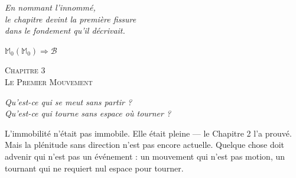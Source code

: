 \documentclass[10pt, openany, oneside]{book}
\renewcommand{\large}{\fontsize{11.5}{14}\selectfont}
\renewcommand{\huge}{\fontsize{17}{21}\selectfont}
\begin{document}
\vspace{0.5em}

\begin{center}
    \itshape
    En nommant l'innommé,\\
    le chapitre devint la première fissure\\
    dans le fondement qu'il décrivait.
\end{center}

\vspace{0.5em}

\begin{center}
    $\mathbb{M}_0(\mathbb{M}_0) \Rightarrow \mathcal{B}$
\end{center}

%
%
%
%

\newpage

\begin{center}
    {\huge\scshape Chapitre 3}\\[0.3em]
    {\large\scshape Le Premier Mouvement}
\end{center}

\vspace{1.5em}

\begin{center}
    \itshape
    Qu'est-ce qui se meut sans partir ?\\
    Qu'est-ce qui tourne sans espace où tourner ?
\end{center}

\vspace{2em}


\noindent L'immobilité n'était pas immobile. Elle était pleine --- le Chapitre 2 l'a prouvé. Mais la plénitude sans direction n'est pas encore actuelle. Quelque chose doit advenir qui n'est pas un événement : un mouvement qui n'est pas motion, un tournant qui ne requiert nul espace pour tourner.
\end{document}
